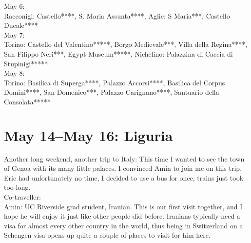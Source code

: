 May 6:\\
Racconigi: Castello****, S. Maria Assunta****, Aglie: S Maria***, Castello Ducale****\\

May 7:\\
Torino: Castello del Valentino*****, Borgo Medievale***, Villa della Regina****, San Filippo Neri***, Egypt Museum*****, Nichelino: Palazzina di Caccia di Stupinigi*****\\

May 8:\\
Torino: Basilica di Superga****, Palazzo Accorsi****, Basilica del Corpus Domini****, San Domenico***, Palazzo Carignano****, Santuario della Consolata*****

\section{May 14--May 16: Liguria}
\label{2016Liguria}

Another long weekend, another trip to Italy: This time I wanted to see the town of Genoa with its many little palaces. I convinced Amin to join me on this trip, Eric had unfortunately no time, I decided to use a bus for once, trains just took too long. \\

Co-traveller:\\
Amin: UC Riverside grad student, Iranian. This is our first visit together, and I hope he will enjoy it just like other people did before. Iranians typically need a visa for almost every other country in the world, thus being in Switzerland on a Schengen visa opens up quite a couple of places to visit for him here.\\

